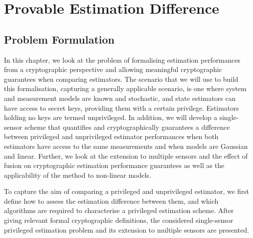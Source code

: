
\chapter{Provable Estimation Difference}\label{ch:priv_estimation}

% 
%                                              
%                                              
%                                              
% 

\section{Problem Formulation}\label{sec:priv_estimation:problem}
In this chapter, we look at the problem of formalising estimation performances from a cryptographic perspective and allowing meaningful cryptographic guarantees when comparing estimators. The scenario that we will use to build this formalisation, capturing a generally applicable scenario, is one where system and measurement models are known and stochastic, and state estimators can have access to secret keys, providing them with a certain privilege. Estimators holding no keys are termed unprivileged. In addition, we will develop a single-sensor scheme that quantifies and cryptographically guarantees a difference between privileged and unprivileged estimator performances when both estimators have access to the same measurements and when models are Gaussian and linear. Further, we look at the extension to multiple sensors and the effect of fusion on cryptographic estimation performance guarantees as well as the applicability of the method to non-linear models.

To capture the aim of comparing a privileged and unprivileged estimator, we first define how to assess the estimation difference between them, and which algorithms are required to characterise a privileged estimation scheme. After giving relevant formal cryptographic definitions, the considered single-sensor privileged estimation problem and its extension to multiple sensors are presented.

% 
% 

